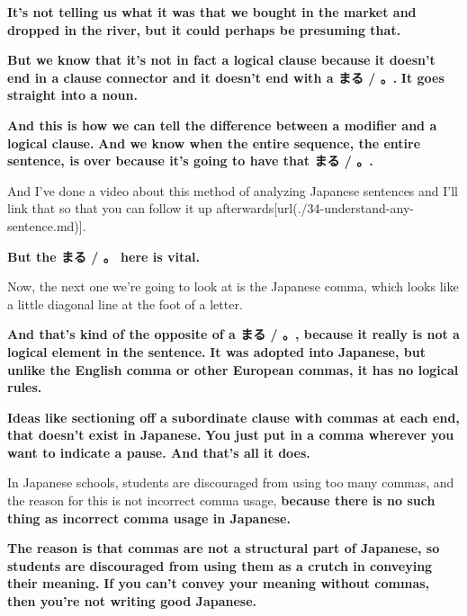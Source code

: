 {\bf It's not telling us what it was that we bought in the market and dropped in the river, but it could perhaps be presuming that.}

{\bf But we know that it's not in fact a logical clause because it doesn't end in a clause connector and it doesn't end with a まる / 。.} {\bf It goes straight into a noun.}

\thinrule

{\bf And this is how we can tell the difference between a modifier and a logical clause.} {\bf And we know when the entire sequence, the entire sentence, is over because it's going to have that まる / 。.}

And I've done a video about this method of analyzing Japanese sentences and I'll link that so that you can follow it up afterwards\goto{{[}34{]}}[url(./34-understand-any-sentence.md)].

{\bf But the まる / 。 here is vital.}

\stopsectionlevel

\startsectionlevel[title={The comma / 、},reference={the-comma}]

Now, the next one we're going to look at is the Japanese comma, which looks like a little diagonal line at the foot of a letter.

{}

{\bf And that's kind of the opposite of a まる / 。, because it really is not a logical element in the sentence.} {\bf It was adopted into Japanese, but unlike the English comma or other European commas, it has no logical rules.}

{\bf Ideas like sectioning off a subordinate clause with commas at each end, that doesn't exist in Japanese.} {\bf You just put in a comma wherever you want to indicate a pause. And that's all it does.}

In Japanese schools, students are discouraged from using too many commas, and the reason for this is not incorrect comma usage, {\bf because there is no such thing as incorrect comma usage in Japanese.}

{\bf The reason is that commas are not a structural part of Japanese, so students are discouraged from using them as a crutch in conveying their meaning.} {\bf If you can't convey your meaning without commas, then you're not writing good Japanese.}

\stopsectionlevel

\startsectionlevel[title={The question mark / ？(はてな)},reference={the-question-mark-はてな}]

